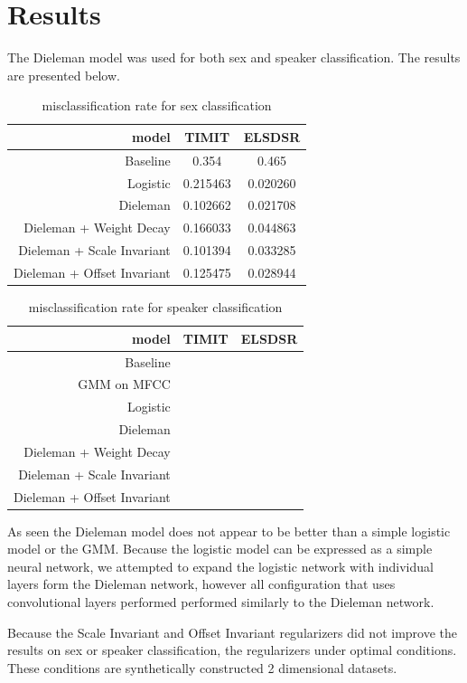 \section{Results}

The Dieleman model was used for both sex and speaker classification. The results are presented below.
\begin{table}[H]
\centering
\begin{tabular}{r|c|c}
	model & TIMIT & ELSDSR \\ \hline
	Baseline & 0.354 & 0.465 \\
	Logistic & 0.215463 & 0.020260 \\
	Dieleman & 0.102662 & 0.021708 \\
	Dieleman + Weight Decay     & 0.166033 & 0.044863 \\
	Dieleman + Scale Invariant  & 0.101394 & 0.033285 \\
	Dieleman + Offset Invariant & 0.125475 & 0.028944
\end{tabular}
\caption{misclassification rate for sex classification}
\end{table}

\begin{table}[H]
\centering
\begin{tabular}{r|c|c}
	model & TIMIT & ELSDSR \\ \hline
	Baseline & \\
	GMM on MFCC & \\
	Logistic & \\
	Dieleman & \\
	Dieleman + Weight Decay     & \\
	Dieleman + Scale Invariant  & \\
	Dieleman + Offset Invariant &
\end{tabular}
\caption{misclassification rate for speaker classification}
\end{table}

As seen the Dieleman model does not appear to be better than a simple logistic model or the GMM. Because the logistic model can be expressed as a simple neural network, we attempted to expand the logistic network with individual layers form the Dieleman network, however all configuration that uses convolutional layers performed performed similarly to the Dieleman network.

Because the Scale Invariant and Offset Invariant regularizers did not improve the results on sex or speaker classification, the regularizers under optimal conditions. These conditions are synthetically constructed 2 dimensional datasets. 

